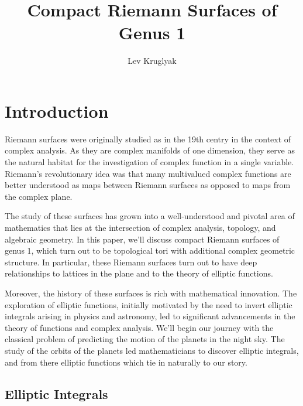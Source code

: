 \documentclass{lkx_paper}
\title{\textbf{Compact Riemann Surfaces of Genus 1}}
\date{}
\author{Lev Kruglyak}
\begin{document}
\maketitle

\tableofcontents

\section{Introduction}

Riemann surfaces were originally studied as in the 19th centry in the context of complex analysis. As they are complex manifolds of one dimension, they serve as the natural habitat for the investigation of complex function in a single variable. Riemann's revolutionary idea was that many multivalued complex functions are better understood as maps between Riemann surfaces as opposed to maps from the complex plane.

The study of these surfaces has grown into a well-understood and pivotal area of mathematics that lies at the intersection of complex analysis, topology, and algebraic geometry. In this paper, we'll discuss compact Riemann surfaces of genus 1, which turn out to be topological tori with additional complex geometric structure. In particular, these Riemann surfaces turn out to have deep relationships to lattices in the plane and to the theory of elliptic functions.

Moreover, the history of these surfaces is rich with mathematical innovation. The exploration of elliptic functions, initially motivated by the need to invert elliptic integrals arising in physics and astronomy, led to significant advancements in the theory of functions and complex analysis. We'll begin our journey with the classical problem of predicting the motion of the planets in the night sky. The study of the orbits of the planets led mathematicians to discover elliptic integrals, and from there elliptic functions which tie in naturally to our story.

\subsection{Elliptic Integrals}
\end{document}
